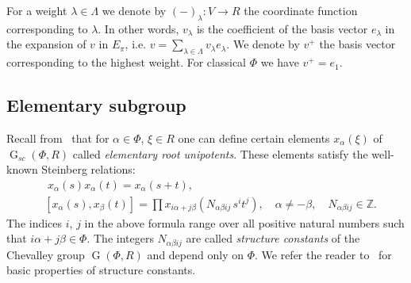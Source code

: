 \documentclass[12pt]{amsart}
\numberwithin{equation}{section}
\theoremstyle{definition}
\DeclareMathOperator{\G}{G}
\begin{document}
For a weight $\lambda\in \Lambda$ we denote by $(-)_\lambda\colon V\to R$ the coordinate function corresponding to $\lambda$.
In other words,  $v_\lambda$ is the coefficient of the basis vector $e_\lambda$ in the expansion of $v$ in $E_\pi$, i.e. $v=\sum_{\lambda\in \Lambda} v_\lambda e_\lambda$.
We denote by $v^+$ the basis vector corresponding to the highest weight.
For classical $\Phi$ we have $v^+=e_1$.

\subsection{Elementary subgroup}\label{sec:elementary}
Recall from~\cite{St78, VP} that for $\alpha\in \Phi$, $\xi\in R$ one can define certain elements $x_{\alpha}(\xi)$ of $\G_{sc}(\Phi, R)$ called {\it elementary root unipotents}.
These elements satisfy the well-known Steinberg relations:
\begin{align}
& \phantom{[}
x_\alpha(s) x_\alpha(t) = x_\alpha(s+t), \label{rel:add}\\
& [x_\alpha(s),  x_\beta(t)] = \prod x_{i\alpha + j\beta}\left(N_{\alpha\beta ij}\, s^i t^j\right),\quad \alpha\neq-\beta, \quad N_{\alpha\beta ij}\in\mathbb{Z}. \label{rel:CCF}
\end{align} 
The indices $i$, $j$ in the above formula range over all positive natural numbers such that $i\alpha + j\beta\in\Phi$.
The integers $N_{\alpha\beta ij}$ are called {\it structure constants} of the Chevalley group $\G(\Phi,R)$ and depend only on $\Phi$.
We refer the reader to~\cite[\S14]{VP} for basic properties of structure constants.
\end{document}
